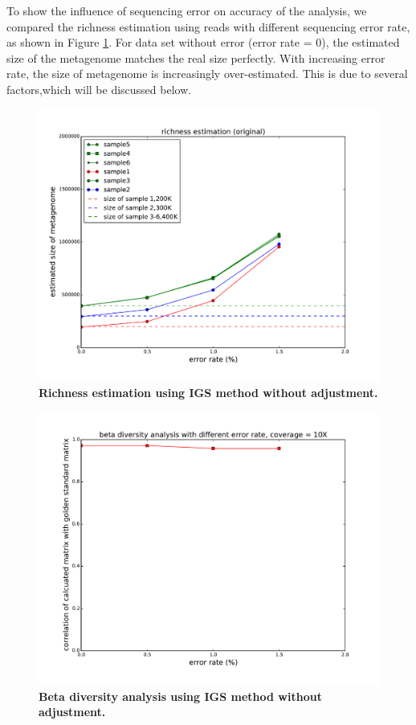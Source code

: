 \documentclass{article}
\begin{document}
To show the influence of sequencing error on accuracy of the 
analysis, we compared the richness estimation using reads with different 
sequencing error rate, as shown in Figure \ref{fig:IGS_richness_no_adjustment}. 
For data set without error (error rate = 0), the estimated size of the metagenome
matches the real size perfectly. With increasing error rate, the size of metagenome
is increasingly over-estimated. This is due to several factors,which
will be discussed below. 
\begin{figure}[!ht]
 \centerline{\includegraphics[width=6in]{./figures/alpha_by_error_no_adjust.pdf}}
\caption{\bf Richness estimation using IGS method without adjustment.}
\label{fig:IGS_richness_no_adjustment}
\end{figure}

\begin{figure}[!ht]
 \centerline{\includegraphics[width=6in]{./figures/beta_by_error.pdf}}
\caption{\bf Beta diversity analysis using IGS method without adjustment.}
\label{fig:beta_no_adjustment}
\end{figure}
\end{document}
